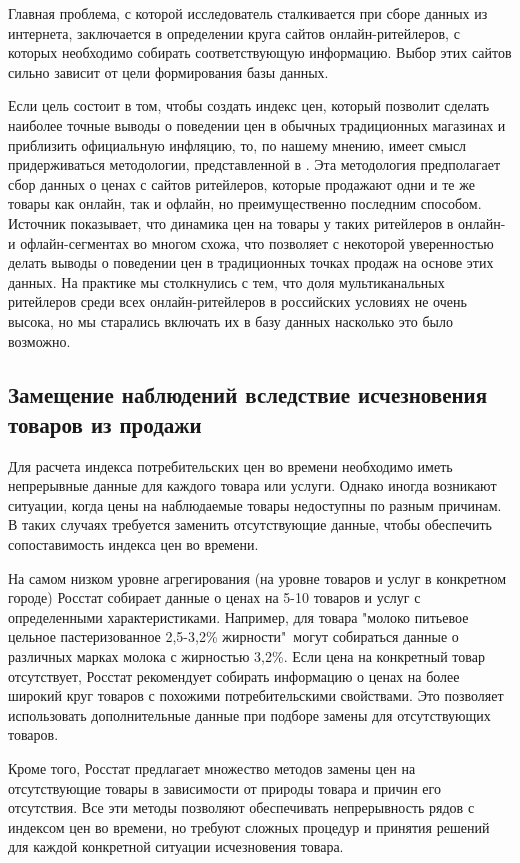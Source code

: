 Главная проблема, с которой исследователь сталкивается при сборе данных из интернета, заключается в определении круга сайтов онлайн-ритейлеров, с которых необходимо собирать соответствующую информацию. Выбор этих сайтов сильно зависит от цели формирования базы данных. 

Если цель состоит в том, чтобы создать индекс цен, который позволит сделать наиболее точные выводы о поведении цен в обычных традиционных магазинах и приблизить официальную инфляцию, то, по нашему мнению, имеет смысл придерживаться методологии, представленной в \cite{cavallo2016billion}. Эта методология предполагает сбор данных о ценах с сайтов ритейлеров, которые продажают одни и те же товары как онлайн, так и офлайн, но преимущественно последним способом. Источник \cite{cavallo2016online} показывает, что динамика цен на товары у таких ритейлеров в онлайн- и офлайн-сегментах во многом схожа, что позволяет с некоторой уверенностью делать выводы о поведении цен в традиционных точках продаж на основе этих данных. На практике мы столкнулись с тем, что доля мультиканальных ритейлеров среди всех онлайн-ритейлеров в российских условиях не очень высока, но мы старались включать их в базу данных насколько это было возможно.

\subsection{Замещение наблюдений вследствие исчезновения товаров из продажи }\label{subsec:ch2/sec2/sub2}

Для расчета индекса потребительских цен во времени необходимо иметь непрерывные данные для каждого товара или услуги. Однако иногда возникают ситуации, когда цены на наблюдаемые товары недоступны по разным причинам. В таких случаях требуется заменить отсутствующие данные, чтобы обеспечить сопоставимость индекса цен во времени.

На самом низком уровне агрегирования (на уровне товаров и услуг в конкретном городе) Росстат собирает данные о ценах на 5-10 товаров и услуг с определенными характеристиками. Например, для товара "молоко питьевое цельное пастеризованное 2,5-3,2\% жирности"~могут собираться данные о различных марках молока с жирностью 3,2\%. Если цена на конкретный товар отсутствует, Росстат рекомендует собирать информацию о ценах на более широкий круг товаров с похожими потребительскими свойствами. Это позволяет использовать дополнительные данные при подборе замены для отсутствующих товаров.

Кроме того, Росстат предлагает множество методов замены цен на отсутствующие товары в зависимости от природы товара и причин его отсутствия. Все эти методы позволяют обеспечивать непрерывность рядов с индексом цен во времени, но требуют сложных процедур и принятия решений для каждой конкретной ситуации исчезновения товара.

